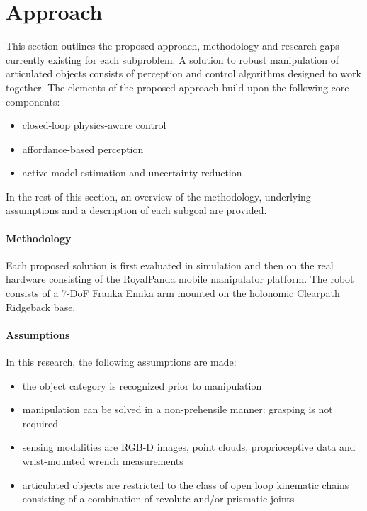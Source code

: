 \section{Approach}
\label{sec:Approach}

This section outlines the proposed approach, methodology and research gaps currently existing for each subproblem. A solution to robust manipulation of articulated objects consists of perception and control algorithms designed to work together. The elements of the proposed approach build upon the following core components:
\begin{itemize}
\item closed-loop physics-aware control
\item affordance-based perception
\item active model estimation and uncertainty reduction
\end{itemize}
In the rest of this section, an overview of the methodology, underlying assumptions and a description of each subgoal are provided. 

\paragraph{Methodology} Each proposed solution is first evaluated in simulation and then on the real hardware consisting of the RoyalPanda mobile manipulator platform. The robot consists of a 7-DoF Franka Emika arm mounted on the holonomic Clearpath Ridgeback base. 

\paragraph{Assumptions} In this research, the following assumptions are made:
\begin{itemize}
\item the object category is recognized prior to manipulation
\item manipulation can be solved in a non-prehensile manner: grasping is not required
\item sensing modalities are RGB-D images, point clouds, proprioceptive data and wrist-mounted wrench measurements 
\item articulated objects are restricted to the class of open loop kinematic chains consisting of a combination of revolute and/or prismatic joints
\end{itemize} 

